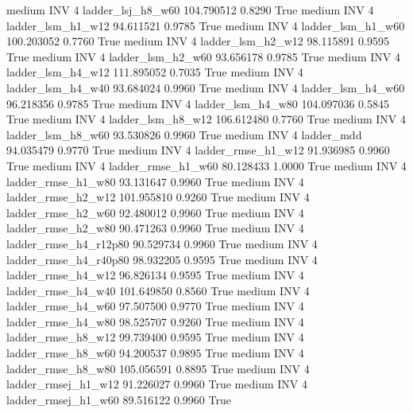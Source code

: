     medium      INV                 4      ladder_lsj_h8_w60 104.790512      0.8290    True
    medium      INV                 4      ladder_lsm_h1_w12  94.611521      0.9785    True
    medium      INV                 4      ladder_lsm_h1_w60 100.203052      0.7760    True
    medium      INV                 4      ladder_lsm_h2_w12  98.115891      0.9595    True
    medium      INV                 4      ladder_lsm_h2_w60  93.656178      0.9785    True
    medium      INV                 4      ladder_lsm_h4_w12 111.895052      0.7035    True
    medium      INV                 4      ladder_lsm_h4_w40  93.684024      0.9960    True
    medium      INV                 4      ladder_lsm_h4_w60  96.218356      0.9785    True
    medium      INV                 4      ladder_lsm_h4_w80 104.097036      0.5845    True
    medium      INV                 4      ladder_lsm_h8_w12 106.612480      0.7760    True
    medium      INV                 4      ladder_lsm_h8_w60  93.530826      0.9960    True
    medium      INV                 4             ladder_mdd  94.035479      0.9770    True
    medium      INV                 4     ladder_rmse_h1_w12  91.936985      0.9960    True
    medium      INV                 4     ladder_rmse_h1_w60  80.128433      1.0000    True
    medium      INV                 4     ladder_rmse_h1_w80  93.131647      0.9960    True
    medium      INV                 4     ladder_rmse_h2_w12 101.955810      0.9260    True
    medium      INV                 4     ladder_rmse_h2_w60  92.480012      0.9960    True
    medium      INV                 4     ladder_rmse_h2_w80  90.471263      0.9960    True
    medium      INV                 4  ladder_rmse_h4_r12p80  90.529734      0.9960    True
    medium      INV                 4  ladder_rmse_h4_r40p80  98.932205      0.9595    True
    medium      INV                 4     ladder_rmse_h4_w12  96.826134      0.9595    True
    medium      INV                 4     ladder_rmse_h4_w40 101.649850      0.8560    True
    medium      INV                 4     ladder_rmse_h4_w60  97.507500      0.9770    True
    medium      INV                 4     ladder_rmse_h4_w80  98.525707      0.9260    True
    medium      INV                 4     ladder_rmse_h8_w12  99.739400      0.9595    True
    medium      INV                 4     ladder_rmse_h8_w60  94.200537      0.9895    True
    medium      INV                 4     ladder_rmse_h8_w80 105.056591      0.8895    True
    medium      INV                 4    ladder_rmsej_h1_w12  91.226027      0.9960    True
    medium      INV                 4    ladder_rmsej_h1_w60  89.516122      0.9960    True
